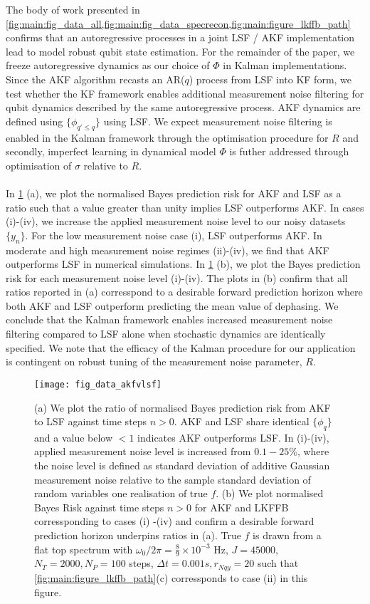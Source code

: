 The body of work presented in \cref{fig:main:fig_data_all,fig:main:fig_data_specrecon,fig:main:figure_lkffb_path} confirms that an autoregressive processes in a joint LSF / AKF implementation lead to model robust qubit state estimation. For the remainder of the paper, we freeze autoregressive dynamics as our choice of $\Phi$ in Kalman implementations. Since the AKF algorithm recasts an AR($q$) process from LSF into KF form, we test whether the KF framework enables additional measurement noise filtering for qubit dynamics described by the same autoregressive process. AKF dynamics are defined using $\{ \phi_{q' \leq q} \}$ using LSF.  We expect measurement noise filtering is enabled in the Kalman framework through the optimisation procedure for $R$ and secondly, imperfect learning in dynamical model $\Phi$ is futher addressed through optimisation of $\sigma$ relative to $R$. 
\\
\\
In \cref{fig:main:fig_data_akfvlsf} (a), we plot the normalised Bayes prediction risk for AKF and LSF as a ratio such that a value greater than unity implies LSF outperforms AKF. In cases (i)-(iv), we increase the applied measurement noise level to our noisy datasets $\{ y_n \}$. For the low measurement noise case (i), LSF outperforms AKF. In moderate and high measurement noise regimes (ii)-(iv), we find that AKF outperforms LSF in numerical simulations. In \cref{fig:main:fig_data_akfvlsf} (b), we plot the Bayes prediction risk for each measurement noise level (i)-(iv). The plots in (b) confirm that all ratios reported in (a) corresspond to a desirable forward prediction horizon where both AKF and LSF outperform predicting the mean value of dephasing. We conclude that the Kalman framework enables increased measurement noise filtering compared to LSF alone when stochastic dynamics are identically specified. We note that the efficacy of the Kalman procedure for our application is contingent on robust tuning of the measurement noise parameter, $R$. 

\begin{figure}
    \texttt{[image: fig\_data\_akfvlsf]}
    \caption{\label{fig:main:fig_data_akfvlsf} (a) We plot the ratio of normalised Bayes prediction risk from AKF to LSF against time steps $n>0$.  AKF and LSF share identical $\{ \phi_q \}$ and  a value below $<1$ indicates AKF outperforms LSF. In (i)-(iv), applied measurement noise level is increased from $0.1 - 25 \%$, where the noise level is defined as standard deviation of additive Gaussian measurement noise relative to the sample standard deviation of random variables one realisation of true $f$. (b) We plot normalised Bayes Risk against time steps $n>0$ for AKF and LKFFB corressponding to cases (i) -(iv) and confirm a desirable forward prediction horizon underpins ratios in (a). True $f$ is drawn from a flat top spectrum with $\omega_0 / 2\pi = \frac{8}{9} \times 10^{-3}$ Hz, $J = 45000$, $N_T = 2000, N_P = 100$ steps, $\Delta t = 0.001s, r_{Nqy}=20$ such that \cref{fig:main:figure_lkffb_path}(c) corressponds to case (ii) in this figure. }
\end{figure}

